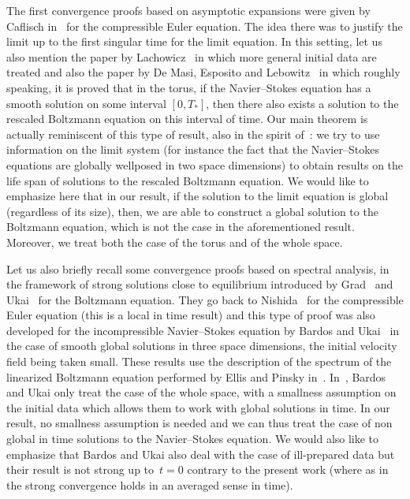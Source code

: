 \documentclass[11pt]{article}
\theoremstyle{definition}
\numberwithin{equation}{section}
\numberwithin{figure}{section}
\numberwithin{table}{section}
\begin{document}
The first convergence proofs based on asymptotic expansions were given by Caflisch in~\cite{Caflisch} for the compressible Euler equation. The idea there was to justify the limit up to the first singular time for the limit equation. In this setting, let us also mention the paper by Lachowicz~\cite{Lachowicz} in which more general initial data are treated and also the paper by De Masi, Esposito and Lebowitz~\cite{DeMasi-Esposito-Lebowitz} in which roughly speaking, it is proved that in the torus, if the Navier--Stokes equation has a smooth solution on some interval $[0,T_*]$, then there also exists a solution to the rescaled Boltzmann equation on this interval of time. Our main theorem is actually reminiscent of this type of result, also in the spirit of~\cite{BMN,CDGG,Grenier,Schochet}: we try to use information on the limit system (for instance the fact that the Navier--Stokes equations are globally wellposed in two space dimensions) to obtain results on the life span of solutions to the rescaled Boltzmann equation. We would like to emphasize here that in our result, if the solution to the limit equation is global (regardless of its size), then, we are able to construct a global solution to the Boltzmann equation, which is not the case in the aforementioned result. Moreover, we treat both the case of the torus and of the whole space.

Let us also briefly recall some convergence proofs based on spectral analysis, in the framework of strong solutions close to equilibrium introduced by Grad~\cite{Grad} and Ukai~\cite{Ukai} for the Boltzmann equation. They go back to Nishida~\cite{Nishida} for the compressible Euler equation (this is a local in time result) and this type of proof was also developed for the incompressible Navier--Stokes equation by Bardos and Ukai~\cite{Bardos-Ukai} in the case of smooth global solutions in three space dimensions, the initial velocity field being taken small. These results use the description of the spectrum of the linearized Boltzmann equation performed by Ellis and Pinsky in~\cite{Ellis-Pinsky}. In~\cite{Bardos-Ukai}, Bardos and Ukai only treat the case of the whole space, with a smallness assumption on the initial data which allows them to work with global solutions in time. In our result, no smallness assumption is needed and we can thus treat the case of non global in time solutions to the Navier--Stokes equation. We would also like to emphasize that Bardos and Ukai also deal with the case of ill-prepared data but their result is not strong up to~$t=0$ contrary to the present work (where as in~\cite{Briant} the strong convergence holds in an averaged sense in time).
\end{document}

